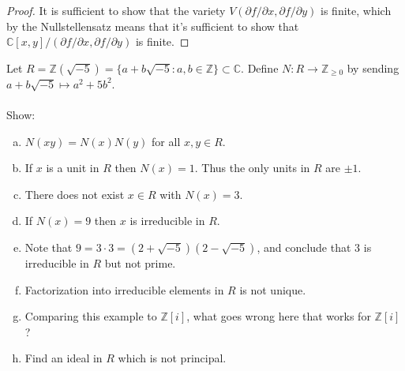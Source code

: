 \documentclass{article}
\newenvironment{problem}[2][Problem]{\begin{trivlist}
\item[\hskip \labelsep {\bfseries #1}\hskip \labelsep {\bfseries #2.}]}{\end{trivlist}}
\newcommand{\set}[1]{\{ #1 \}}
\newcommand{\fn}[3]{#1 \colon #2 \rightarrow #3}
\begin{document}
\begin{proof}
  It is sufficient to show that the variety
  $V(\partial f/\partial x, \partial f/\partial y)$
  is finite, which by the Nullstellensatz means that it's sufficient to show that
  $\mathbb C[x, y]/(\partial f/\partial x, \partial f/\partial y)$ is finite.
\end{proof}
\pagebreak
\begin{problem}[Extra]{Problem}
  Let $R = \mathbb Z(\sqrt{-5}) = \set{a + b\sqrt{-5}:a, b \in \mathbb Z} \subset \mathbb C$.
  Define
  $\fn NR{\mathbb Z_{\geq 0}}$ by sending
  $a + b\sqrt{-5} \mapsto a^2 + 5 b^2$.
  \\~\\
  Show:
  \begin{enumerate}[(a)]
    \item $N(xy) = N(x)N(y)$ for all $x,y \in R$.
    \item If $x$ is a unit in $R$ then $N(x) = 1$. Thus the only units in $R$
      are $\pm 1$.
    \item There does not exist $x \in R$ with $N(x) = 3$.
    \item If $N(x) = 9$ then $x$ is irreducible in $R$.
    \item Note that $9 = 3 \cdot 3 = (2 + \sqrt{-5})(2 - \sqrt{-5})$, and
      conclude that $3$ is irreducible in $R$ but not prime.
    \item Factorization into irreducible elements in $R$ is not unique.
    \item Comparing this example to $\mathbb Z[i]$, what goes wrong here that
      works for $\mathbb Z[i]$?
    \item Find an ideal in $R$ which is not principal.
  \end{enumerate}
\end{problem}
\end{document}

